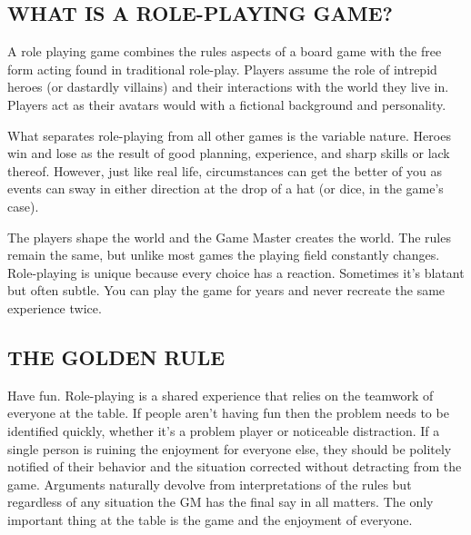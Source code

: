 \begin{multicols}{2}

\subsection{WHAT IS A ROLE-PLAYING GAME?}
A role playing game combines the rules aspects of a board game with the free form acting found in traditional role-play.  Players assume the role of intrepid heroes (or dastardly villains) and their interactions with the world they live in.  Players act as their avatars would with a fictional background and personality.  

What separates role-playing from all other games is the variable nature.  Heroes win and lose as the result of good planning, experience, and sharp skills or lack thereof.  However, just like real life, circumstances can get the better of you as events can sway in either direction at the drop of a hat (or dice, in the game's case).  

The players shape the world and the Game Master creates the world.  The rules remain the same, but unlike most games the playing field constantly changes.  Role-playing is unique because every choice has a reaction.  Sometimes it's blatant but often subtle.  You can play the game for years and never recreate the same experience twice.  

 
\subsection{THE GOLDEN RULE}
Have fun.  Role-playing is a shared experience that relies on the teamwork of everyone at the table.  If people aren't having fun then the problem needs to be identified quickly, whether it's a problem player or noticeable distraction.  If a single person is ruining the enjoyment for everyone else, they should be politely notified of their behavior and the situation corrected without detracting from the game.  Arguments naturally devolve from interpretations of the rules but regardless of any situation the GM has the final say in all matters.  The only important thing at the table is the game and the enjoyment of everyone.


\end{multicols}
